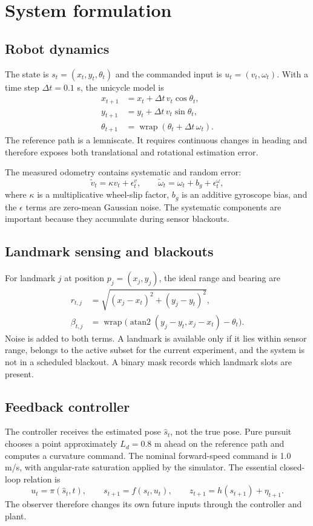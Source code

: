 \documentclass[11pt]{article}
\begin{document}
\section{System formulation}
\subsection{Robot dynamics}
The state is $s_t=(x_t,y_t,\theta_t)$ and the commanded input is $u_t=(v_t,\omega_t)$. With a time step $\Delta t=0.1$ s, the unicycle model is
\begin{align}
 x_{t+1} &= x_t + \Delta t\,v_t\cos\theta_t,\\
 y_{t+1} &= y_t + \Delta t\,v_t\sin\theta_t,\\
 \theta_{t+1} &= \operatorname{wrap}(\theta_t+\Delta t\,\omega_t).
\end{align}
The reference path is a lemniscate. It requires continuous changes in heading and therefore exposes both translational and rotational estimation error.

The measured odometry contains systematic and random error:
\begin{equation}
 \tilde v_t=\kappa v_t+\epsilon^v_t, \qquad
 \tilde\omega_t=\omega_t+b_g+\epsilon^\omega_t,
\end{equation}
where $\kappa$ is a multiplicative wheel-slip factor, $b_g$ is an additive gyroscope bias, and the $\epsilon$ terms are zero-mean Gaussian noise. The systematic components are important because they accumulate during sensor blackouts.

\subsection{Landmark sensing and blackouts}
For landmark $j$ at position $p_j=(x_j,y_j)$, the ideal range and bearing are
\begin{align}
 r_{t,j} &= \sqrt{(x_j-x_t)^2+(y_j-y_t)^2},\\
 \beta_{t,j} &= \operatorname{wrap}\bigl(\operatorname{atan2}(y_j-y_t,x_j-x_t)-\theta_t\bigr).
\end{align}
Noise is added to both terms. A landmark is available only if it lies within sensor range, belongs to the active subset for the current experiment, and the system is not in a scheduled blackout. A binary mask records which landmark slots are present.

\subsection{Feedback controller}
The controller receives the estimated pose $\hat s_t$, not the true pose. Pure pursuit chooses a point approximately $L_d=0.8$ m ahead on the reference path and computes a curvature command. The nominal forward-speed command is 1.0 m/s, with angular-rate saturation applied by the simulator. The essential closed-loop relation is
\begin{equation}
 u_t=\pi(\hat s_t,t),\qquad
 s_{t+1}=f(s_t,u_t),\qquad
 z_{t+1}=h(s_{t+1})+\eta_{t+1}.
\end{equation}
The observer therefore changes its own future inputs through the controller and plant.
\end{document}
